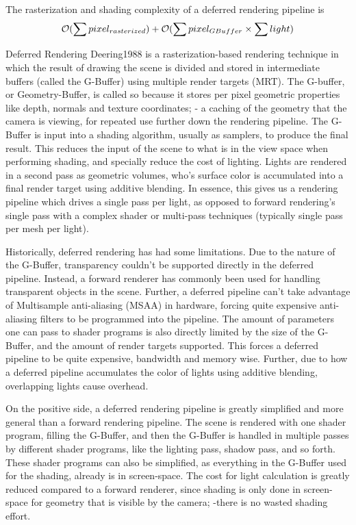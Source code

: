 The rasterization and shading complexity of a deferred rendering pipeline is
\begin{equation}\label{eq:DRP_complexity}
		\mathcal{O}(\sum {pixel_{rasterized}}) + \mathcal{O}(\sum {pixel_{GBuffer}} \times \sum {light})
\end{equation}

Deferred Rendering Deering1988 is a rasterization-based rendering technique in which the result of drawing the scene is divided and stored in intermediate buffers (called the G-Buffer) using multiple render targets (MRT).  The G-buffer, or Geometry-Buffer, is called so because it stores per pixel geometric properties like depth, normals and texture coordinates; - a caching of the geometry that the camera is viewing, for repeated use further down the rendering pipeline. The G-Buffer is input into a shading algorithm, usually as samplers, to produce the final result. This reduces the input of the scene to what is in the view space when performing shading, and specially reduce the cost of lighting. Lights are rendered in a second pass as geometric volumes, who's surface color is accumulated into a final render target using additive blending. In essence, this gives us a rendering pipeline which drives a single pass per light, as opposed to forward rendering's single pass with a complex shader or multi-pass techniques (typically single pass per mesh per light).

Historically, deferred rendering has had some limitations. Due to the nature of the G-Buffer, transparency couldn't be supported directly in the deferred pipeline. Instead, a forward renderer has commonly been used for handling transparent objects in the scene. Further, a deferred pipeline can't take advantage of Multisample anti-aliasing (MSAA) in hardware, forcing quite expensive anti-aliasing filters to be programmed into the pipeline. The amount of parameters one can pass to shader programs is also directly limited by the size of the G-Buffer, and the amount of render targets supported. This forces a deferred pipeline to be quite expensive, bandwidth and memory wise. Further, due to how a deferred pipeline accumulates the color of lights using additive blending, overlapping lights cause overhead.

On the positive side, a deferred rendering pipeline is greatly simplified and more general than a forward rendering pipeline. The scene is rendered with one shader program, filling the G-Buffer, and then the G-Buffer is handled in multiple passes by different shader programs, like the lighting pass, shadow pass, and so forth. These shader programs can also be simplified, as everything in the G-Buffer used for the shading, already is in screen-space. The cost for light calculation is greatly reduced compared to a forward renderer, since shading is only done in screen-space for geometry that is visible by the camera; -there is no wasted shading effort.

